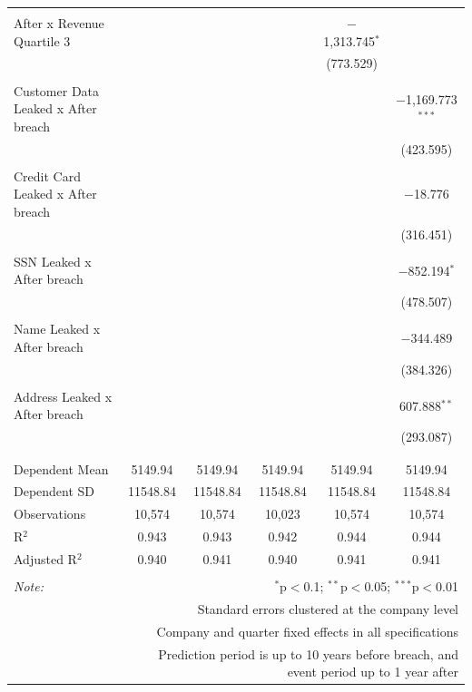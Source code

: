 \documentclass[../Main.tex]{subfiles}
\begin{document}
\begin{table}[!htbp]
{\begin{tabular}{@{\extracolsep{5pt}}lccccc}
  & & & & & \\ 
 After x Revenue Quartile 3 &  &  &  & $-$1,313.745$^{*}$ &  \\ 
  &  &  &  & (773.529) &  \\ 
  & & & & & \\ 
 Customer Data Leaked x After breach &  &  &  &  & $-$1,169.773$^{***}$ \\ 
  &  &  &  &  & (423.595) \\ 
  & & & & & \\ 
 Credit Card Leaked x After breach &  &  &  &  & $-$18.776 \\ 
  &  &  &  &  & (316.451) \\ 
  & & & & & \\ 
 SSN Leaked x After breach &  &  &  &  & $-$852.194$^{*}$ \\ 
  &  &  &  &  & (478.507) \\ 
  & & & & & \\ 
 Name Leaked x After breach &  &  &  &  & $-$344.489 \\ 
  &  &  &  &  & (384.326) \\ 
  & & & & & \\ 
 Address Leaked x After breach &  &  &  &  & 607.888$^{**}$ \\ 
  &  &  &  &  & (293.087) \\ 
  & & & & & \\ 
\hline \\[-1.8ex] 
Dependent Mean & 5149.94 & 5149.94 & 5149.94 & 5149.94 & 5149.94 \\ 
Dependent SD & 11548.84 & 11548.84 & 11548.84 & 11548.84 & 11548.84 \\ 
Observations & 10,574 & 10,574 & 10,023 & 10,574 & 10,574 \\ 
R$^{2}$ & 0.943 & 0.943 & 0.942 & 0.944 & 0.944 \\ 
Adjusted R$^{2}$ & 0.940 & 0.941 & 0.940 & 0.941 & 0.941 \\ 
\hline 
\hline \\[-1.8ex] 
\textit{Note:}  & \multicolumn{5}{r}{$^{*}$p$<$0.1; $^{**}$p$<$0.05; $^{***}$p$<$0.01} \\ 
 & \multicolumn{5}{r}{Standard errors clustered at the company level} \\ 
 & \multicolumn{5}{r}{Company and quarter fixed effects in all specifications} \\ 
 & \multicolumn{5}{r}{Prediction period is up to 10 years before breach, and event period up to 1 year after} \\ 
\end{tabular}}
\end{table} 
\end{document}
